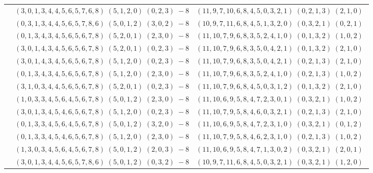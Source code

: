 \documentclass[11pt]{article}
\begin{document}
\begin{longtable}[l]{|c|c|c|}
 \cline{2-3} 
 & $(3 ,0 ,1 ,3 ,4 ,4 ,5 ,6 ,5 ,7 ,6 ,8) \;(5 ,1 ,2 ,0) \;(0 ,2 ,3) \;-8$ & $(11 ,9 ,7 ,10 ,6 ,8 ,4 ,5 ,0 ,3 ,2 ,1) \;(0 ,2 ,1 ,3) \;(2 ,1 ,0) \;$\\ 
 \cline{2-3} 
 & $(0 ,3 ,1 ,3 ,4 ,4 ,5 ,6 ,5 ,7 ,8 ,6) \;(5 ,0 ,1 ,2) \;(3 ,0 ,2) \;-8$ & $(10 ,9 ,7 ,11 ,6 ,8 ,4 ,5 ,1 ,3 ,2 ,0) \;(0 ,3 ,2 ,1) \;(0 ,2 ,1) \;$\\ 
 \cline{2-3} 
 & $(0 ,1 ,3 ,4 ,3 ,4 ,5 ,6 ,5 ,6 ,7 ,8) \;(5 ,2 ,0 ,1) \;(2 ,3 ,0) \;-8$ & $(11 ,10 ,7 ,9 ,6 ,8 ,3 ,5 ,2 ,4 ,1 ,0) \;(0 ,1 ,3 ,2) \;(1 ,0 ,2) \;$\\ 
 \cline{2-3} 
 & $(3 ,0 ,1 ,4 ,3 ,4 ,5 ,6 ,5 ,6 ,7 ,8) \;(5 ,2 ,0 ,1) \;(0 ,2 ,3) \;-8$ & $(11 ,10 ,7 ,9 ,6 ,8 ,3 ,5 ,0 ,4 ,2 ,1) \;(0 ,1 ,3 ,2) \;(2 ,1 ,0) \;$\\ 
 \cline{2-3} 
 & $(3 ,0 ,1 ,4 ,3 ,4 ,5 ,6 ,5 ,6 ,7 ,8) \;(5 ,1 ,2 ,0) \;(0 ,2 ,3) \;-8$ & $(11 ,10 ,7 ,9 ,6 ,8 ,3 ,5 ,0 ,4 ,2 ,1) \;(0 ,2 ,1 ,3) \;(2 ,1 ,0) \;$\\ 
 \cline{2-3} 
 & $(0 ,1 ,3 ,4 ,3 ,4 ,5 ,6 ,5 ,6 ,7 ,8) \;(5 ,1 ,2 ,0) \;(2 ,3 ,0) \;-8$ & $(11 ,10 ,7 ,9 ,6 ,8 ,3 ,5 ,2 ,4 ,1 ,0) \;(0 ,2 ,1 ,3) \;(1 ,0 ,2) \;$\\ 
 \cline{2-3} 
 & $(3 ,1 ,0 ,3 ,4 ,4 ,5 ,6 ,5 ,6 ,7 ,8) \;(5 ,2 ,0 ,1) \;(0 ,2 ,3) \;-8$ & $(11 ,10 ,7 ,9 ,6 ,8 ,4 ,5 ,0 ,3 ,1 ,2) \;(0 ,1 ,3 ,2) \;(2 ,1 ,0) \;$\\ 
 \cline{2-3} 
 & $(1 ,0 ,3 ,3 ,4 ,5 ,6 ,4 ,5 ,6 ,7 ,8) \;(5 ,0 ,1 ,2) \;(2 ,3 ,0) \;-8$ & $(11 ,10 ,6 ,9 ,5 ,8 ,4 ,7 ,2 ,3 ,0 ,1) \;(0 ,3 ,2 ,1) \;(1 ,0 ,2) \;$\\ 
 \cline{2-3} 
 & $(3 ,0 ,1 ,3 ,4 ,5 ,4 ,6 ,5 ,6 ,7 ,8) \;(5 ,1 ,2 ,0) \;(0 ,2 ,3) \;-8$ & $(11 ,10 ,7 ,9 ,5 ,8 ,4 ,6 ,0 ,3 ,2 ,1) \;(0 ,2 ,1 ,3) \;(2 ,1 ,0) \;$\\ 
 \cline{2-3} 
 & $(0 ,1 ,3 ,3 ,4 ,5 ,6 ,4 ,5 ,6 ,7 ,8) \;(5 ,0 ,1 ,2) \;(3 ,2 ,0) \;-8$ & $(11 ,10 ,6 ,9 ,5 ,8 ,4 ,7 ,2 ,3 ,1 ,0) \;(0 ,3 ,2 ,1) \;(0 ,1 ,2) \;$\\ 
 \cline{2-3} 
 & $(0 ,1 ,3 ,3 ,4 ,5 ,4 ,6 ,5 ,6 ,7 ,8) \;(5 ,1 ,2 ,0) \;(2 ,3 ,0) \;-8$ & $(11 ,10 ,7 ,9 ,5 ,8 ,4 ,6 ,2 ,3 ,1 ,0) \;(0 ,2 ,1 ,3) \;(1 ,0 ,2) \;$\\ 
 \cline{2-3} 
 & $(1 ,3 ,0 ,3 ,4 ,5 ,6 ,4 ,5 ,6 ,7 ,8) \;(5 ,0 ,1 ,2) \;(2 ,0 ,3) \;-8$ & $(11 ,10 ,6 ,9 ,5 ,8 ,4 ,7 ,1 ,3 ,0 ,2) \;(0 ,3 ,2 ,1) \;(2 ,0 ,1) \;$\\ 
 \cline{2-3} 
 & $(3 ,0 ,1 ,3 ,4 ,4 ,5 ,6 ,5 ,7 ,8 ,6) \;(5 ,0 ,1 ,2) \;(0 ,3 ,2) \;-8$ & $(10 ,9 ,7 ,11 ,6 ,8 ,4 ,5 ,0 ,3 ,2 ,1) \;(0 ,3 ,2 ,1) \;(1 ,2 ,0) \;$\\ 

\end{longtable}
\end{document}
